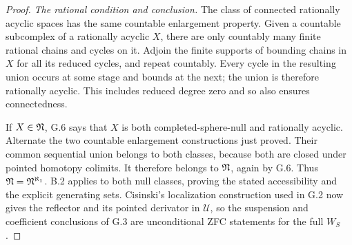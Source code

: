 \begin{proof}
\emph{The rational condition and conclusion.}
The class of connected rationally acyclic spaces has the same countable enlargement property. Given a countable subcomplex of a rationally acyclic $X$, there are only countably many finite rational chains and cycles on it. Adjoin the finite supports of bounding chains in $X$ for all its reduced cycles, and repeat countably. Every cycle in the resulting union occurs at some stage and bounds at the next; the union is therefore rationally acyclic. This includes reduced degree zero and so also ensures connectedness.

If $X\in\mathfrak N$, G.6 says that $X$ is both completed-sphere-null and rationally acyclic. Alternate the two countable enlargement constructions just proved. Their common sequential union belongs to both classes, because both are closed under pointed homotopy colimits. It therefore belongs to $\mathfrak N$, again by G.6. Thus $\mathfrak N=\mathfrak N^{\aleph_1}$. B.2 applies to both null classes, proving the stated accessibility and the explicit generating sets. Cisinski's localization construction used in G.2 now gives the reflector and its pointed derivator in $\mathcal U$, so the suspension and coefficient conclusions of G.3 are unconditional ZFC statements for the full $W_S$.
\end{proof}
